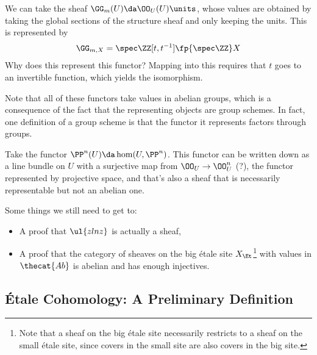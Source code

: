 \begin{example}[?]

We can take the sheaf \(\GG_m(U) \da \OO_U(U)\units\), whose values are
obtained by taking the global sections of the structure sheaf and only
keeping the units. This is represented by
\begin{align*}
\GG_{m, X} = \spec \ZZ[t, t^{-1}] \fp{\spec \ZZ} X
\end{align*} Why does this represent this functor? Mapping into this
requires that \(t\) goes to an invertible function, which yields the
isomorphism.

\end{example}

\begin{remark}

Note that all of these functors take values in abelian groups, which is
a consequence of the fact that the representing objects are group
schemes. In fact, one definition of a group scheme is that the functor
it represents factors through groups.

\end{remark}

\begin{example}[?]

Take the functor \(\PP^n(U) \da \hom(U, \PP^n)\). This functor can be
written down as a line bundle on \(U\) with a surjective map from
\(\OO_U \to \OO_U^n\) (?), the functor represented by projective space,
and that's also a sheaf that is necessarily representable but not an
abelian one.

\end{example}

Some things we still need to get to:

\begin{itemize}
\tightlist
\item
  A proof that \(\ul{zlnz}\) is actually a sheaf,
\item
  A proof that the category of sheaves on the big étale site
  \(X_\Et\)\footnote{Note that a sheaf on the big étale site necessarily
    restricts to a sheaf on the small étale site, since covers in the
    small site are also covers in the big site.} with values in
  \(\thecat{Ab}\) is abelian and has enough injectives.
\end{itemize}

\hypertarget{uxe9tale-cohomology-a-preliminary-definition}{%
\subsection{Étale Cohomology: A Preliminary
Definition}\label{uxe9tale-cohomology-a-preliminary-definition}}

